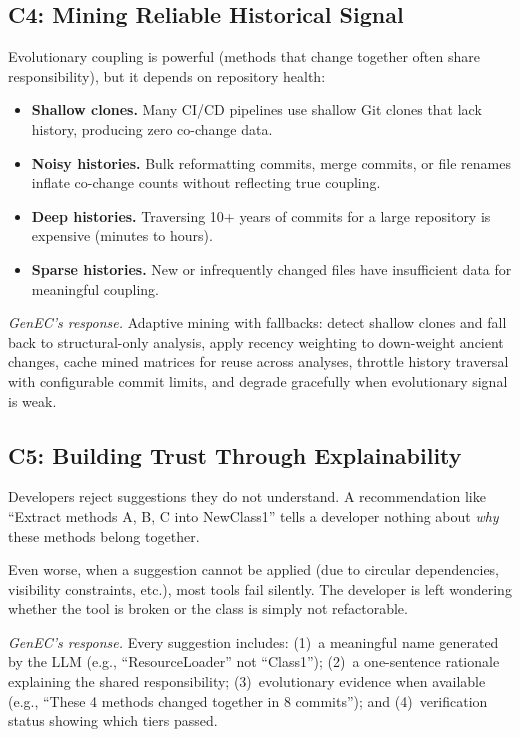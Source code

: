 \documentclass[sigconf]{acmart}
\begin{document}
\subsection{C4: Mining Reliable Historical Signal}
\label{sec:c4}

Evolutionary coupling is powerful (methods that change together often share
responsibility), but it depends on repository health:
\begin{itemize}
  \item \textbf{Shallow clones.}  Many CI/CD pipelines use shallow Git clones
        that lack history, producing zero co-change data.
  \item \textbf{Noisy histories.}  Bulk reformatting commits, merge commits, or
        file renames inflate co-change counts without reflecting true coupling.
  \item \textbf{Deep histories.}  Traversing 10+ years of commits for a large
        repository is expensive (minutes to hours).
  \item \textbf{Sparse histories.}  New or infrequently changed files have
        insufficient data for meaningful coupling.
\end{itemize}

\emph{GenEC's response.}  Adaptive mining with fallbacks: detect shallow clones
and fall back to structural-only analysis, apply recency weighting to
down-weight ancient changes, cache mined matrices for reuse across analyses,
throttle history traversal with configurable commit limits, and degrade
gracefully when evolutionary signal is weak.

\subsection{C5: Building Trust Through Explainability}
\label{sec:c5}

Developers reject suggestions they do not understand. A recommendation like
``Extract methods A, B, C into NewClass1'' tells a developer nothing about
\emph{why} these methods belong together.

Even worse, when a suggestion cannot be applied (due to circular dependencies,
visibility constraints, etc.), most tools fail silently. The developer is left
wondering whether the tool is broken or the class is simply not refactorable.

\emph{GenEC's response.}  Every suggestion includes: (1)~a meaningful name
generated by the LLM (e.g., ``ResourceLoader'' not ``Class1''); (2)~a
one-sentence rationale explaining the shared responsibility; (3)~evolutionary
evidence when available (e.g., ``These 4 methods changed together in 8
commits''); and (4)~verification status showing which tiers passed.
\end{document}
